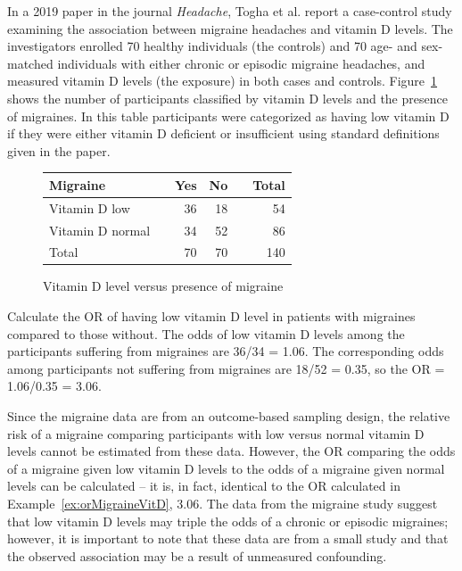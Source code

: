 In a 2019 paper in the journal \textit{Headache}, Togha et al. report a case-control study examining the association between migraine headaches and vitamin D levels.  The investigators enrolled 70 healthy individuals (the controls) and 70 age- and sex-matched individuals with either chronic or episodic migraine headaches, and measured vitamin D levels (the exposure) in both cases and controls.  Figure~\ref{figure:migraineVitD} shows the number of participants classified by vitamin D levels and the presence of migraines. In this table participants were categorized as having low vitamin D if they were either vitamin D deficient or insufficient using standard definitions given in the paper.

\begin{figure}[h]
	\centering
	\begin{tabular}{ll rrr r}
		\hline
		Migraine	 & \hspace{2mm} & Yes & No & \hspace{2mm} & Total \\
		\hline
		Vitamin D low & & 36 & 18  &  & 54  \\
		Vitamin D normal &	& 34 & 52 &  & 86  \\
        Total & & 70 & 70 & & 140 \\
		\hline
	\end{tabular}
	\caption{Vitamin D level versus presence of migraine}
    \label{figure:migraineVitD}
\end{figure}

\begin{examplewrap}
  \begin{nexample}{Calculate the OR of having low vitamin D level in patients with migraines compared to those without.} \label{ex:orMigraineVitD}
  The odds of low vitamin D levels among the participants suffering from migraines are 36/34 = 1.06.  The corresponding odds among participants not suffering from migraines are 18/52 = 0.35, so the OR = 1.06/0.35 = 3.06.
\end{nexample}
\end{examplewrap}

Since the migraine data are from an outcome-based sampling design, the relative risk of a migraine comparing participants with low versus normal vitamin D levels cannot be estimated from these data. However, the OR comparing the odds of a migraine given low vitamin D levels to the odds of a migraine given normal levels can be calculated -- it is, in fact, identical to the OR calculated in Example~\ref{ex:orMigraineVitD}, 3.06. The data from the migraine study suggest that low vitamin D levels may triple the odds of a chronic or episodic migraines; however, it is important to note that these data are from a small study and that the observed association may be a result of unmeasured confounding.

